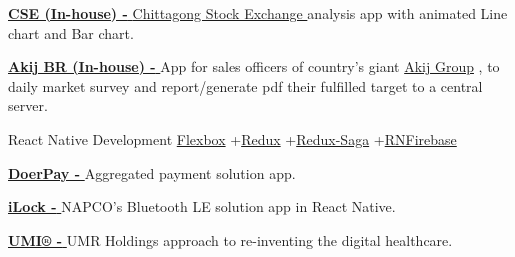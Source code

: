 \begin{projectentries}
{\begin{projectitems}
        \item {{\href{https://drive.google.com/file/d/1AE3tdaTBA1hnKjhM2Quv4poWi6oQthwy/view?usp=sharing}{\textbf{CSE (In-house) - }}}
        {\href{https://www.cse.com.bd/}{Chittagong Stock Exchange }}
        analysis app with animated Line chart and Bar chart.}  
        \item {{\href{https://www.akij.net/}{\textbf{Akij BR (In-house) - }}}
        App for sales officers of country's giant 
        {\href{https://www.akij.net}{Akij Group}}
        , to daily market survey and report/generate pdf their fulfilled target to a central server.}  
      \end{projectitems}
    }
    

    \projectentry 
    {React Native Development} 
    {{\href{https://css-tricks.com/snippets/css/a-guide-to-flexbox/}{Flexbox}}
    +{\href{https://redux.js.org/basics/usagewithreact}{Redux}}
    +{\href{https://redux.js.org/basics/usagewithreact}{Redux-Saga}}
    +{\href{https://rnfirebase.io/}{RNFirebase}}}
    {
      \begin{projectitems} %
        \item {{\href{http://doer.com.bd}{\textbf{DoerPay - }}}
        Aggregated payment solution app.}
        \item {{\href{http://www.alarmlock.com/news/architech-bluetooth/}{\textbf{iLock - }}}
        NAPCO's Bluetooth LE solution app in React Native.}
        \item {{\href{http://www.alarmlock.com/news/architech-bluetooth/}{\textbf{UMI® - }}}
        UMR Holdings approach to re-inventing the digital healthcare.}
      \end{projectitems}
    }
\end{projectentries}
